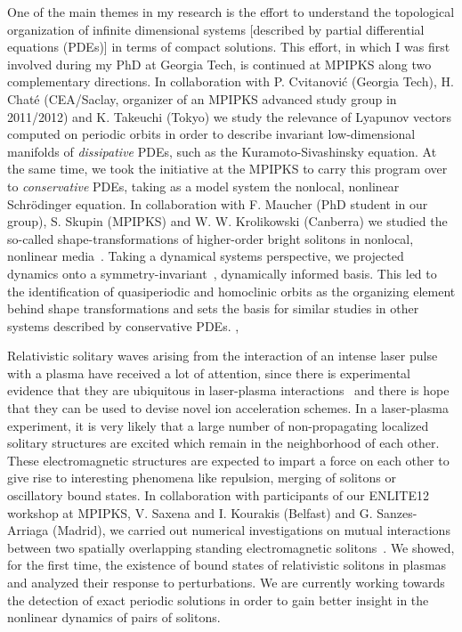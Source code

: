 \documentclass[11pt,a4paper,final]{moderncv}
\begin{document}
One of the main themes in my research is the effort to understand the topological organization of 
infinite dimensional systems [described by partial differential equations (PDEs)] in terms of compact solutions.
This effort, in which I was first involved during my PhD at Georgia Tech, is continued at MPIPKS along two complementary
directions. In collaboration with P. Cvitanovi\'c (Georgia Tech), H. Chat\'e (CEA/Saclay, organizer of
an MPIPKS advanced study group in 2011/2012) and K. Takeuchi (Tokyo) we study the relevance of
Lyapunov vectors computed on periodic orbits in order to describe invariant low-dimensional manifolds
of \emph{dissipative} PDEs, such as the Kuramoto-Sivashinsky equation.
At the same time, we took the initiative
at the MPIPKS to carry this program over to \emph{conservative} PDEs, taking as a model system the nonlocal, nonlinear
Schr\"odinger equation. In collaboration with F. Maucher (PhD student in our group), S. Skupin (MPIPKS) and W. W. Krolikowski (Canberra)
we studied the so-called shape-transformations of higher-order bright solitons in nonlocal, nonlinear media~\cite{maucher2013}.
Taking a dynamical systems perspective, we projected dynamics onto a symmetry-invariant~\cite{SiCvi10, atlas12},
dynamically informed basis. This led to the identification of quasiperiodic and homoclinic orbits 
as the organizing element behind shape transformations and sets the basis for similar studies in other systems
described by conservative PDEs.
\sep

Relativistic solitary waves arising from the interaction of an intense laser pulse with a plasma have received
a lot of attention, since there is experimental evidence that they are ubiquitous in laser-plasma interactions~\cite{borghesi02,sarri10}
and there is hope that they can be used to devise novel ion acceleration schemes.
In a laser-plasma experiment, it is very likely that a large number of non-propagating 
localized solitary structures are excited which remain in the neighborhood of each other. 
These electromagnetic structures are expected to impart a force on each other
to give rise to interesting phenomena like repulsion, merging of
solitons or oscillatory bound states. 
In collaboration with participants of our ENLITE12 workshop at MPIPKS, V. Saxena and I. Kourakis (Belfast) 
and G. Sanzes-Arriaga (Madrid), we carried out numerical investigations on mutual 
interactions between two spatially overlapping standing 
electromagnetic solitons~\cite{saxena2013}.
We showed, for the first time, the existence of bound states of relativistic solitons in plasmas and analyzed their 
response to perturbations. We are currently working towards the detection of
exact periodic solutions in order to gain better insight in the nonlinear dynamics of pairs of solitons.
\end{document}
